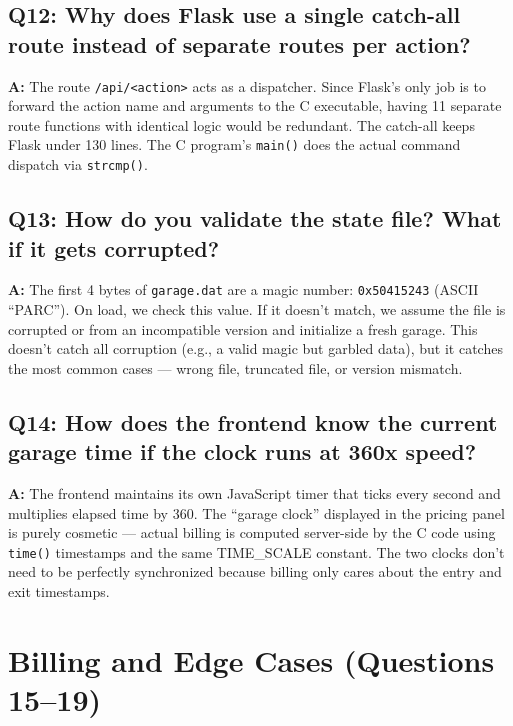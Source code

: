 \documentclass[12pt, a4paper]{article}
\begin{document}
\subsection{Q12: Why does Flask use a single catch-all route instead of separate routes per action?}

\textbf{A:} The route \texttt{/api/<action>} acts as a dispatcher. Since Flask's only job is to forward the action name and arguments to the C executable, having 11 separate route functions with identical logic would be redundant. The catch-all keeps Flask under 130 lines. The C program's \texttt{main()} does the actual command dispatch via \texttt{strcmp()}.

\subsection{Q13: How do you validate the state file? What if it gets corrupted?}

\textbf{A:} The first 4 bytes of \texttt{garage.dat} are a magic number: \texttt{0x50415243} (ASCII ``PARC''). On load, we check this value. If it doesn't match, we assume the file is corrupted or from an incompatible version and initialize a fresh garage. This doesn't catch all corruption (e.g., a valid magic but garbled data), but it catches the most common cases --- wrong file, truncated file, or version mismatch.

\subsection{Q14: How does the frontend know the current garage time if the clock runs at 360x speed?}

\textbf{A:} The frontend maintains its own JavaScript timer that ticks every second and multiplies elapsed time by 360. The ``garage clock'' displayed in the pricing panel is purely cosmetic --- actual billing is computed server-side by the C code using \texttt{time()} timestamps and the same TIME\_SCALE constant. The two clocks don't need to be perfectly synchronized because billing only cares about the entry and exit timestamps.

\section{Billing and Edge Cases (Questions 15--19)}
\end{document}
